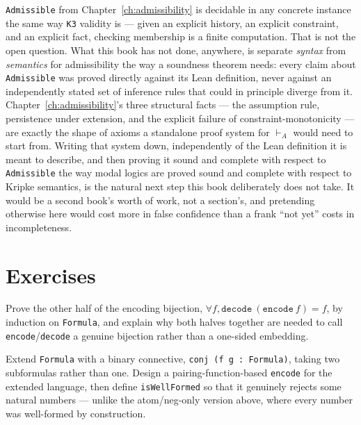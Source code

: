 \texttt{Admissible} from Chapter~\ref{ch:admissibility} is decidable
in any concrete instance the same way \texttt{K3} validity is —
given an explicit history, an explicit constraint, and an explicit
fact, checking membership is a finite computation. That is not the
open question. What this book has not done, anywhere, is separate
\emph{syntax} from \emph{semantics} for admissibility the way a
soundness theorem needs: every claim about \texttt{Admissible} was
proved directly against its Lean definition, never against an
independently stated set of inference rules that could in principle
diverge from it. Chapter~\ref{ch:admissibility}'s three structural
facts — the assumption rule, persistence under extension, and the
explicit failure of constraint-monotonicity — are exactly the
shape of axioms a standalone proof system for $\vdash_{\!A}$ would
need to start from. Writing that system down, independently of the
Lean definition it is meant to describe, and then proving it sound
and complete with respect to \texttt{Admissible} the way modal
logics are proved sound and complete with respect to Kripke
semantics, is the natural next step this book deliberately does not
take. It would be a second book's worth of work, not a section's,
and pretending otherwise here would cost more in false confidence
than a frank ``not yet'' costs in incompleteness.

\section{Exercises}

\begin{exercise}
Prove the other half of the encoding bijection,
$\forall f, \mathtt{decode}\ (\mathtt{encode}\ f) = f$, by induction
on \texttt{Formula}, and explain why both halves together are needed
to call \texttt{encode}/\texttt{decode} a genuine bijection rather
than a one-sided embedding.
\end{exercise}

\begin{exercise}
Extend \texttt{Formula} with a binary connective,
\texttt{conj (f g : Formula)}, taking two subformulas rather than
one. Design a pairing-function-based \texttt{encode} for the
extended language, then define \texttt{isWellFormed} so that it
genuinely rejects some natural numbers — unlike the atom/neg-only
version above, where every number was well-formed by construction.
\end{exercise}
